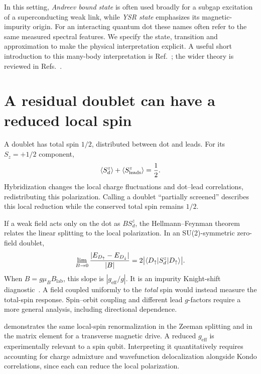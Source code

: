In this setting, \emph{Andreev bound state} is often used broadly for a subgap
excitation of a superconducting weak link, while \emph{YSR state} emphasizes
its magnetic-impurity origin. For an interacting quantum dot these names often
refer to the same measured spectral features. We specify the state, transition
and approximation to make the physical interpretation explicit. A useful
short introduction to this many-body interpretation is
Ref.~\cite{zitko2018superconducting}; the wider theory is reviewed in
Refs.~\cite{martinrodero2011josephson,meden2019andersonjosephson}.

\section{A residual doublet can have a reduced local spin}

A doublet has total spin $1/2$, distributed between dot and leads.
For its $S_z=+1/2$ component,
\begin{equation}
 \langle S_d^z\rangle+\langle S_{\mathrm{leads}}^z\rangle=\frac12.
\end{equation}
Hybridization changes the local charge fluctuations and dot--lead correlations,
redistributing this polarization. Calling a doublet ``partially screened''
describes this local reduction while the conserved total spin remains $1/2$.

If a weak field acts only on the dot as $B S_d^z$, the Hellmann--Feynman theorem
relates the linear splitting to the local polarization. In an SU(2)-symmetric
zero-field doublet,
\begin{equation}\label{eq:local-spin-slope}
 \lim_{B\to0}\frac{|E_{D_{\uparrow}}-E_{D_{\downarrow}}|}{|B|}
 =2\bigl|\langle D_{\uparrow}\vert S_d^z\vert D_{\uparrow}\rangle\bigr|.
\end{equation}
When $B=g\mu_B B_{\mathrm{lab}}$, this slope is $|g_{\mathrm{eff}}/g|$.
It is an impurity Knight-shift diagnostic~\cite{pavesic2023impurity}. A field
coupled uniformly to the \emph{total} spin would instead measure the total-spin
response. Spin--orbit coupling and different lead $g$-factors require a more
general analysis, including directional dependence.

 demonstrates the same local-spin renormalization in the Zeeman
splitting and in the matrix element for a transverse magnetic drive. A reduced
$g_{\mathrm{eff}}$ is experimentally relevant to a spin qubit. Interpreting it
quantitatively requires accounting for charge admixture and wavefunction
delocalization alongside Kondo correlations, since each can reduce the local polarization.

